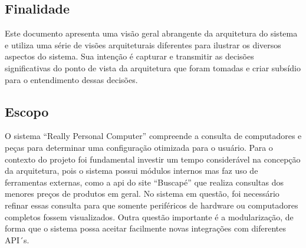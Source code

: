 \subsection{Finalidade}

Este documento apresenta uma visão geral abrangente da arquitetura do sistema e utiliza uma série de visões arquiteturais diferentes para ilustrar os diversos aspectos do sistema. Sua intenção é capturar e transmitir as decisões significativas do ponto de vista da arquitetura que foram tomadas e criar subsídio para o entendimento dessas decisões.

\subsection{Escopo}

O sistema “Really Personal Computer” compreende a consulta de computadores e peças para determinar uma configuração otimizada para o usuário. Para o contexto do projeto foi fundamental investir um tempo considerável na concepção da arquitetura, pois o sistema possui módulos internos mas faz uso de ferramentas externas, como a api do site “Buscapé” que realiza consultas dos menores preços de produtos em geral. No sistema em questão, foi necessário refinar essas consulta para que somente periféricos de hardware ou computadores completos fossem visualizados. Outra questão importante é a modularização, de forma que o sistema possa aceitar facilmente novas integrações com diferentes API´s.